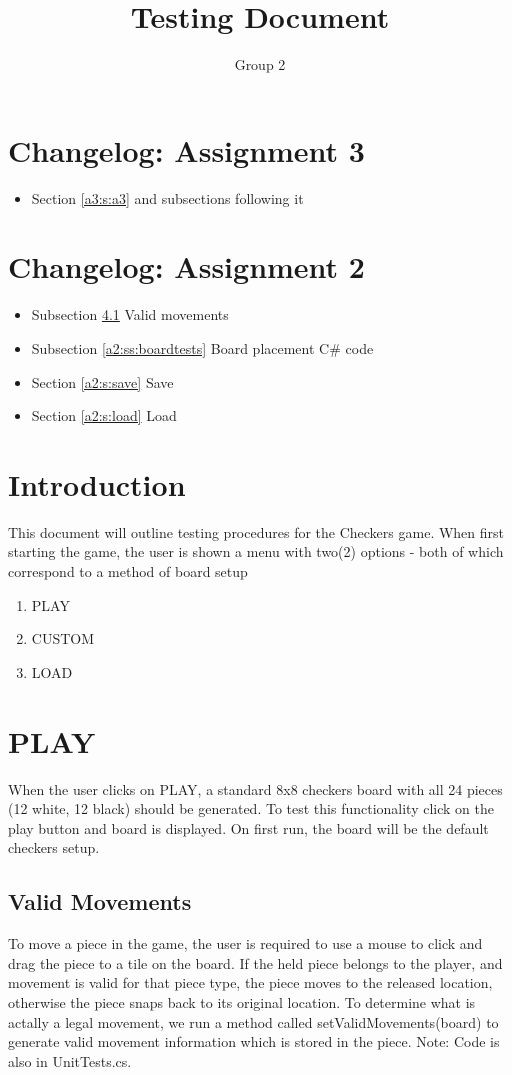\documentclass{article}
\title{\bf Testing Document}
\author{Group 2}
\date{\vspace{-5ex}}
\begin{document}
\maketitle
\tableofcontents

\section{Changelog: Assignment 3}
\begin{itemize}
\item Section \ref{a3:s:a3} and subsections following it
\end{itemize}

\section{Changelog: Assignment 2}
\begin{itemize}
\item Subsection \ref{a2:ss:valid} Valid movements
\item Subsection \ref{a2:ss:boardtests} Board placement C\# code
\item Section \ref{a2:s:save} Save
\item Section \ref{a2:s:load} Load
\end{itemize}


\section{Introduction}
This document will outline testing procedures for the Checkers game. When first starting the game, the user is shown a menu with two(2) options - both of which correspond to a method of board setup 
\begin{enumerate}
\item PLAY
\item CUSTOM
\item LOAD
\end{enumerate}

\section{PLAY}
When the user clicks on PLAY, a standard 8x8 checkers board with all 24 pieces (12 white, 12 black) should be generated.
To test this functionality click on the play button and board is displayed. On first run, the board will be the default checkers setup.

\subsection{Valid Movements} \label{a2:ss:valid}
To move a piece in the game, the user is required to use a mouse to click and drag the piece to a tile on the board.
If the held piece belongs to the player, and movement is valid for that piece type, the piece moves to the released location, otherwise the piece snaps back to its original location.
To determine what is actally a legal movement, we run a method called setValidMovements(board) to generate valid movement information which is stored in the piece.
Note: Code is also in UnitTests.cs.
\end{document}
